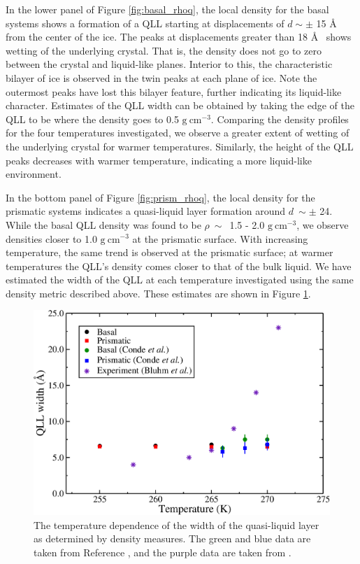In the lower panel of Figure \ref{fig:basal_rhoq}, the local density
for the basal systems shows a formation of a QLL starting at
displacements of $d\sim\pm$ 15 \AA~ from the center of the ice. The
peaks at displacements greater than 18 \AA~ shows wetting of the
underlying crystal. That is, the density does not go to zero between
the crystal and liquid-like planes. Interior to this, the
characteristic bilayer of ice is observed in the twin peaks at each
plane of ice. Note the outermost peaks have lost this bilayer
feature, further indicating its liquid-like character. Estimates of
the QLL width can be obtained by taking the edge of the QLL to be
where the density goes to 0.5 $\mathrm{g}~\mathrm{cm}^{-3}$. Comparing
the density profiles for the four temperatures investigated, we
observe a greater extent of wetting of the underlying crystal for
warmer temperatures. Similarly, the height of the QLL peaks decreases
with warmer temperature, indicating a more liquid-like environment.

In the bottom panel of Figure \ref{fig:prism_rhoq}, the local density
for the prismatic systems indicates a quasi-liquid layer formation
around $d~\sim\pm$ 24. While the basal QLL density was found to be
$\rho~ \sim$~1.5 - 2.0 $\mathrm{g}~\mathrm{cm}^{-3}$, we observe
densities closer to 1.0 $\mathrm{g}~\mathrm{cm}^{-3}$ at the prismatic
surface. With increasing temperature, the same trend is observed at the
prismatic surface; at warmer temperatures the QLL's density comes
closer to that of the bulk liquid. We have estimated the width of the
QLL at each temperature investigated using the same density metric
described above. These estimates are shown in Figure
\ref{fig:qllWidth}.  

\begin{figure}
\includegraphics[width=\linewidth]{Figures/qllWidthT}
\caption{\label{fig:qllWidth} The temperature dependence of the width
  of the quasi-liquid layer as determined by density measures. The
  green and blue data are taken from Reference \cite{Conde2008}, and
  the purple data are taken from \cite{Bluhm2002}. }
\end{figure}           

